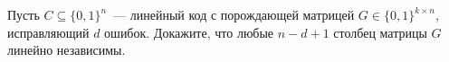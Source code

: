 Пусть $C \subseteq \{0, 1\}^n$~--- линейный код с порождающей матрицей $G \in \{0, 1\}^{k \times n}$, исправляющий $d$
ошибок. Докажите, что любые $n - d + 1$ столбец матрицы $G$ линейно независимы.